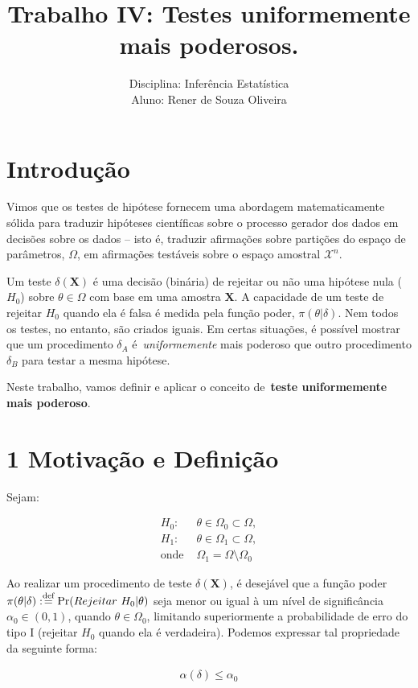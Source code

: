 \documentclass[a4paper,10pt, notitlepage]{report}
\title{Trabalho IV: Testes uniformemente mais poderosos.}
\author{Disciplina: Inferência Estatística \\ Aluno: Rener de Souza Oliveira}
\newcommand{\bX}{\boldsymbol{X}} %
\newcommand{\defn}{\stackrel{\textrm{\scriptsize def}}{=}}
\newcommand{\mysection}[2]{\setcounter{section}{#1}\addtocounter{section}{-1}\section*{#1 #2}}
\newcommand{\op}{\operatorname}
\begin{document}
	\maketitle

	
	\section*{Introdução}
	
	Vimos que os testes de hipótese fornecem uma abordagem matematicamente sólida para traduzir hipóteses científicas sobre o processo gerador dos dados em decisões sobre os dados -- isto é, traduzir afirmações sobre partições do espaço de parâmetros, $\Omega$, em afirmações testáveis sobre o espaço amostral $\mathcal{X}^n$.
	
	Um teste $\delta(\bX)$ é uma decisão (binária) de rejeitar ou não uma hipótese nula ($H_0$) sobre $\theta \in \Omega$ com base em uma amostra $\bX$.
	A capacidade de um teste de rejeitar $H_0$ quando ela é falsa é medida pela função poder, $\pi(\theta |\delta)$.
	Nem todos os testes, no entanto, são criados iguais.
	Em certas situações, é possível mostrar que um procedimento $\delta_A$ é~\textit{uniformemente} mais poderoso que outro procedimento $\delta_B$ para testar a mesma hipótese.
	
	Neste trabalho, vamos definir e aplicar o conceito de~\textbf{teste uniformemente mais poderoso}.
	
	\mysection{1}{Motivação e Definição}
	
	Sejam:
	
	\begin{align}
	\label{h0h1}
	 H_0:& \theta \in \Omega_0\subset \Omega,\nonumber\\
	 H_1:& \theta \in \Omega_1\subset \Omega,\\
	 \text{onde } &\Omega_1= \Omega \setminus \Omega_0\nonumber
	\end{align}
	
	
	Ao realizar um procedimento de teste $\delta(\bX)$, é desejável que a função poder $\pi(\theta|\delta):\defn \op{Pr}(Rejeitar ~H_0|\theta)$ seja menor ou igual à um nível de significância $\alpha_0\in (0,1)$, quando $\theta\in\Omega_0$, limitando superiormente a probabilidade de erro do tipo I (rejeitar $H_0$ quando ela é verdadeira). Podemos expressar tal propriedade da seguinte forma:
	
	\begin{align*}
		\alpha(\delta)\leq \alpha_0
	\end{align*}
	
\end{document}
